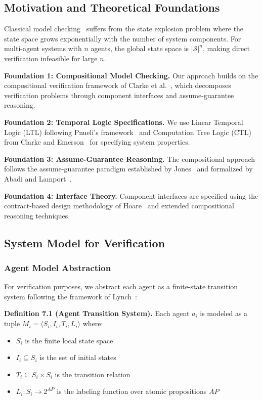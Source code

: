 \documentclass[conference]{IEEEtran}
\begin{document}
\subsection{Motivation and Theoretical Foundations}

Classical model checking~\cite{clarke1999model} suffers from the state explosion problem where the state space grows exponentially with the number of system components. For multi-agent systems with $n$ agents, the global state space is $|\mathcal{S}|^n$, making direct verification infeasible for large $n$.

\textbf{Foundation 1: Compositional Model Checking.} Our approach builds on the compositional verification framework of Clarke et al.~\cite{clarke1989compositional}, which decomposes verification problems through component interfaces and assume-guarantee reasoning.

\textbf{Foundation 2: Temporal Logic Specifications.} We use Linear Temporal Logic (LTL) following Pnueli's framework~\cite{pnueli1977temporal} and Computation Tree Logic (CTL) from Clarke and Emerson~\cite{clarke1999model} for specifying system properties.

\textbf{Foundation 3: Assume-Guarantee Reasoning.} The compositional approach follows the assume-guarantee paradigm established by Jones~\cite{jones1983tentative} and formalized by Abadi and Lamport~\cite{abadi2010logic}.

\textbf{Foundation 4: Interface Theory.} Component interfaces are specified using the contract-based design methodology of Hoare~\cite{hoare1969axiomatic} and extended compositional reasoning techniques.

\subsection{System Model for Verification}

\subsubsection{Agent Model Abstraction}

For verification purposes, we abstract each agent as a finite-state transition system following the framework of Lynch~\cite{lynch1996distributed}:

\textbf{Definition 7.1 (Agent Transition System).} Each agent $a_i$ is modeled as a tuple $M_i = \langle S_i, I_i, T_i, L_i \rangle$ where:
\begin{itemize}
    \item $S_i$ is the finite local state space
    \item $I_i \subseteq S_i$ is the set of initial states
    \item $T_i \subseteq S_i \times S_i$ is the transition relation
    \item $L_i: S_i \rightarrow 2^{AP}$ is the labeling function over atomic propositions $AP$
\end{itemize}
\end{document}
